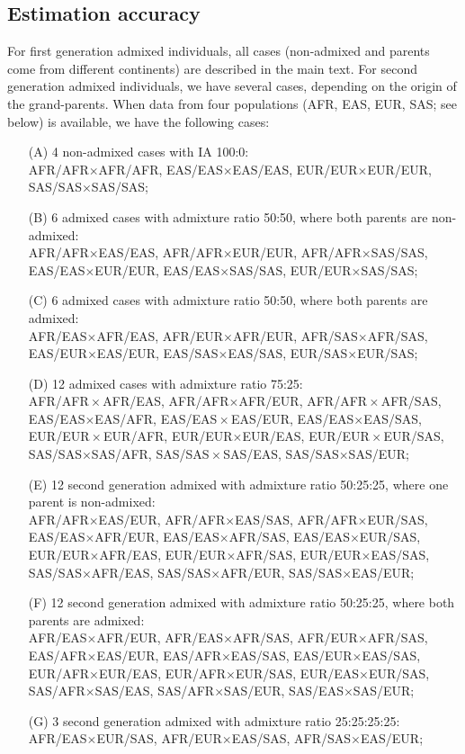 \documentclass[12pt]{article}
\theoremstyle{definition}
\begin{document}
\subsection{Estimation accuracy}
For first generation admixed individuals, all cases (non-admixed and
parents come from different continents) are described in the main
text. For second generation admixed individuals, we have several
cases, depending on the origin of the grand-parents.  When data from
four populations (AFR, EAS, EUR, SAS; see below) is available, we have
the following cases:
\begin{itemize}
\item[(A)] 4 non-admixed cases with IA 100:0: \\
  AFR/AFR$\times$AFR/AFR, EAS/EAS$\times$EAS/EAS,
  EUR/EUR$\times$EUR/EUR, SAS/SAS$\times$SAS/SAS;
\item[(B)] 6 admixed cases with admixture ratio 50:50, where both
  parents are non-admixed:\\
  AFR/AFR$\times$EAS/EAS, AFR/AFR$\times$EUR/EUR,
  AFR/AFR$\times$SAS/SAS, EAS/EAS$\times$EUR/EUR,
  EAS/EAS$\times$SAS/SAS, EUR/EUR$\times$SAS/SAS;
\item[(C)] 6 admixed cases with admixture ratio 50:50, where both
  parents are admixed:\\
  AFR/EAS$\times$AFR/EAS, AFR/EUR$\times$AFR/EUR,
  AFR/SAS$\times$AFR/SAS, EAS/EUR$\times$EAS/EUR,
  EAS/SAS$\times$EAS/SAS, EUR/SAS$\times$EUR/SAS;
\item[(D)] 12 admixed cases with admixture ratio 75:25:\\
  AFR/AFR$\!\times$AFR/EAS, AFR/AFR$\times$AFR/EUR,
  AFR/AFR$\!\times$AFR/SAS, EAS/EAS$\times$EAS/AFR,
  EAS/EAS$\!\times$EAS/EUR, EAS/EAS$\times$EAS/SAS,
  EUR/EUR$\!\times$EUR/AFR, EUR/EUR$\times$EUR/EAS,
  EUR/EUR$\!\times$EUR/SAS, SAS/SAS$\times$SAS/AFR,
  SAS/SAS$\!\times$SAS/EAS, SAS/SAS$\times$SAS/EUR;
\item[(E)] 12 second generation admixed with admixture ratio 50:25:25,
  where one parent is non-admixed:\\
  AFR/AFR$\times$EAS/EUR, AFR/AFR$\times$EAS/SAS,
  AFR/AFR$\times$EUR/SAS, EAS/EAS$\times$AFR/EUR,
  EAS/EAS$\times$AFR/SAS, EAS/EAS$\times$EUR/SAS,
  EUR/EUR$\times$AFR/EAS, EUR/EUR$\times$AFR/SAS,
  EUR/EUR$\times$EAS/SAS, SAS/SAS$\times$AFR/EAS,
  SAS/SAS$\times$AFR/EUR, SAS/SAS$\times$EAS/EUR;
\item[(F)] 12 second generation admixed with admixture ratio 50:25:25,
  where both parents are admixed:\\
  AFR/EAS$\times$AFR/EUR, AFR/EAS$\times$AFR/SAS,
  AFR/EUR$\times$AFR/SAS, EAS/AFR$\times$EAS/EUR,
  EAS/AFR$\times$EAS/SAS, EAS/EUR$\times$EAS/SAS,
  EUR/AFR$\times$EUR/EAS, EUR/AFR$\times$EUR/SAS,
  EUR/EAS$\times$EUR/SAS, SAS/AFR$\times$SAS/EAS,
  SAS/AFR$\times$SAS/EUR, SAS/EAS$\times$SAS/EUR;
\item[(G)] 3 second generation admixed with admixture ratio
  25:25:25:25:\\
  AFR/EAS$\times$EUR/SAS, AFR/EUR$\times$EAS/SAS,
  AFR/SAS$\times$EAS/EUR;
\end{itemize}
\end{document}

